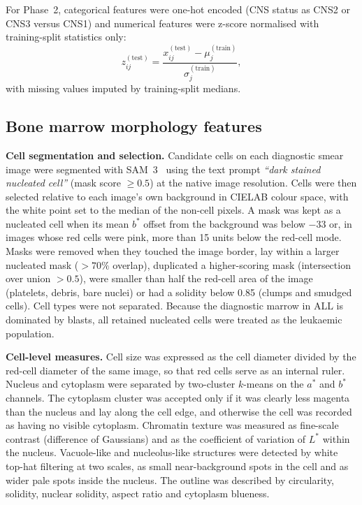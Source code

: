 \documentclass[pdflatex,sn-nature]{sn-jnl}
\begin{document}
For Phase~2, categorical features were one-hot encoded (CNS status as
CNS2 or CNS3 versus CNS1) and numerical features were z-score
normalised with training-split statistics only:
\begin{equation}
z_{ij}^{(\text{test})} =
\frac{x_{ij}^{(\text{test})} - \mu_j^{(\text{train})}}
     {\sigma_j^{(\text{train})}},
\label{eq:zscore}
\end{equation}
with missing values imputed by training-split medians.

\subsection{Bone marrow morphology features}\label{sec:morph}

\textbf{Cell segmentation and selection.}
Candidate cells on each diagnostic smear image were segmented with
SAM~3~\cite{[CITE:SAM]} using the text prompt \textit{``dark stained
nucleated cell''} (mask score $\geq 0.5$) at the native image
resolution.
Cells were then selected relative to each image's own background in
CIELAB colour space, with the white point set to the median of the
non-cell pixels.
A mask was kept as a nucleated cell when its mean $b^*$ offset from the
background was below $-33$ or, in images whose red cells were pink,
more than 15 units below the red-cell mode.
Masks were removed when they touched the image border, lay within a
larger nucleated mask ($>70\%$ overlap), duplicated a higher-scoring
mask (intersection over union $>0.5$), were smaller than half the
red-cell area of the image (platelets, debris, bare nuclei) or had a
solidity below 0.85 (clumps and smudged cells).
Cell types were not separated.
Because the diagnostic marrow in ALL is dominated by blasts, all
retained nucleated cells were treated as the leukaemic population.

\textbf{Cell-level measures.}
Cell size was expressed as the cell diameter divided by the red-cell
diameter of the same image, so that red cells serve as an internal
ruler.
Nucleus and cytoplasm were separated by two-cluster $k$-means on the
$a^*$ and $b^*$ channels.
The cytoplasm cluster was accepted only if it was clearly less magenta
than the nucleus and lay along the cell edge, and otherwise the cell
was recorded as having no visible cytoplasm.
Chromatin texture was measured as fine-scale contrast (difference of
Gaussians) and as the coefficient of variation of $L^*$ within the
nucleus.
Vacuole-like and nucleolus-like structures were detected by white
top-hat filtering at two scales, as small near-background spots in the
cell and as wider pale spots inside the nucleus.
The outline was described by circularity, solidity, nuclear solidity,
aspect ratio and cytoplasm blueness.
\end{document}
